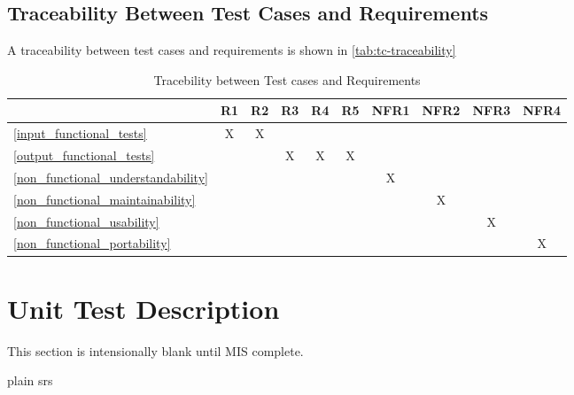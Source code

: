 \documentclass[12pt, titlepage]{article}
\begin{document}
\subsection{Traceability Between Test Cases and Requirements}

A traceability between test cases and requirements is shown in \autoref{tab:tc-traceability} 



\begin{table}[h!]
\begin{center}
\begin{tabular}{ l|c|c|c|c|c|c|c|c|c }
\hline
 & R1   & R2 & R3 & R4 & R5 & NFR1 & NFR2 & NFR3 & NFR4 \\
\hline
\ref{input_functional_tests} & X & X & & & & & & \\
\hline
\ref{output_functional_tests} &  &  & X & X & X & & & \\
\hline
\ref{non_functional_understandability} & & & & & & X & & & \\
\hline
\ref{non_functional_maintainability} & & & & & & & X & & \\
\hline
\ref{non_functional_usability} & & & & & & & & X & \\
\hline
\ref{non_functional_portability} & & & & & & & & & X \\

\hline
\end{tabular}
\caption{Tracebility between Test cases and Requirements}
\label{tab:tc-traceability}
\end{center}
\end{table}

\section{Unit Test Description}
This section is intensionally blank until MIS complete.

\newpage
 {plain}
 {srs}
\end{document}
